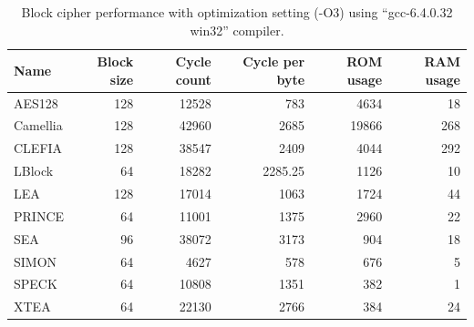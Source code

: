 \documentclass[sigconf, review=false]{acmart}
\begin{document}
\begin{table}[tbp]
\centering
\caption{Block cipher performance with optimization setting (-O3) using ``gcc-6.4.0.32 win32'' compiler.}
\label{tab-speed}
\begin{tabular}{lrrrrr}
    \toprule
Name     & Block size & Cycle count & Cycle per byte & ROM usage & RAM usage \\
    \midrule
AES128   & 128        & 12528       & 783            & 4634      & 18        \\
Camellia & 128        & 42960       & 2685           & 19866     & 268       \\
CLEFIA   & 128        & 38547       & 2409           & 4044      & 292       \\
LBlock   & 64         & 18282       & 2285.25        & 1126      & 10        \\
LEA      & 128        & 17014       & 1063           & 1724      & 44        \\
PRINCE   & 64         & 11001       & 1375           & 2960      & 22        \\
SEA      & 96         & 38072       & 3173           & 904       & 18        \\
SIMON    & 64         & 4627        & 578            & 676       & 5         \\
SPECK    & 64         & 10808       & 1351           & 382       & 1         \\
XTEA     & 64         & 22130       & 2766           & 384       & 24       \\
    \bottomrule
\end{tabular}
\end{table}
\end{document}
